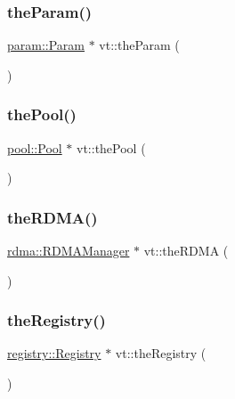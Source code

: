 \mbox{\label{namespacevt_a268431014c9031c0f7c33d32c1b8645c}} 
\subsubsection{\texorpdfstring{the\+Param()}{theParam()}}
{\footnotesize\ttfamily \hyperlink{structvt_1_1param_1_1_param}{param\+::\+Param} $\ast$ vt\+::the\+Param (\begin{DoxyParamCaption}{ }\end{DoxyParamCaption})}

\mbox{\label{namespacevt_aab3530d89a64e5ea903b0ccf303ecbb7}} 
\subsubsection{\texorpdfstring{the\+Pool()}{thePool()}}
{\footnotesize\ttfamily \hyperlink{structvt_1_1pool_1_1_pool}{pool\+::\+Pool} $\ast$ vt\+::the\+Pool (\begin{DoxyParamCaption}{ }\end{DoxyParamCaption})}

\mbox{\label{namespacevt_a68b8410bc2b86d3b5228d7dbb6b40bac}} 
\subsubsection{\texorpdfstring{the\+R\+D\+M\+A()}{theRDMA()}}
{\footnotesize\ttfamily \hyperlink{structvt_1_1rdma_1_1_r_d_m_a_manager}{rdma\+::\+R\+D\+M\+A\+Manager} $\ast$ vt\+::the\+R\+D\+MA (\begin{DoxyParamCaption}{ }\end{DoxyParamCaption})}

\mbox{\label{namespacevt_a8b5994a5aedabc64006ce820db2e938c}} 
\subsubsection{\texorpdfstring{the\+Registry()}{theRegistry()}}
{\footnotesize\ttfamily \hyperlink{structvt_1_1registry_1_1_registry}{registry\+::\+Registry} $\ast$ vt\+::the\+Registry (\begin{DoxyParamCaption}{ }\end{DoxyParamCaption})}

